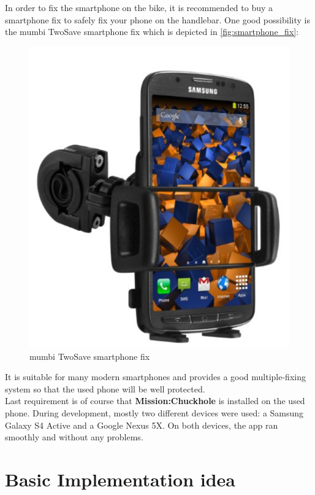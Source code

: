 \documentclass[10pt,a4paper]{article} %
\begin{document}
	In order to fix the smartphone on the bike, it is recommended to buy a smartphone fix to safely fix your phone on the handlebar. One good possibility is the mumbi TwoSave smartphone fix which is  depicted in \autoref{fig:smartphone_fix}:
	
	\begin{figure}[H]
		\begin{center}
 		  \includegraphics[scale=0.3]{smartphone_fix}
		  \caption{mumbi TwoSave smartphone fix}
		  \label{fig:smartphone_fix}
		\end{center}
	\end{figure}
	\noindent
	It is suitable for many modern smartphones and provides a good multiple-fixing system so that the used phone will be well protected.\\
	Last requirement is of course that \textbf{Mission:Chuckhole} is installed on the used phone.
	During development, mostly two different devices were used: a Samsung Galaxy S4 Active and a Google Nexus 5X.
	On both devices, the app ran smoothly and without any problems.


    \section{Basic Implementation idea}
	
\end{document}
